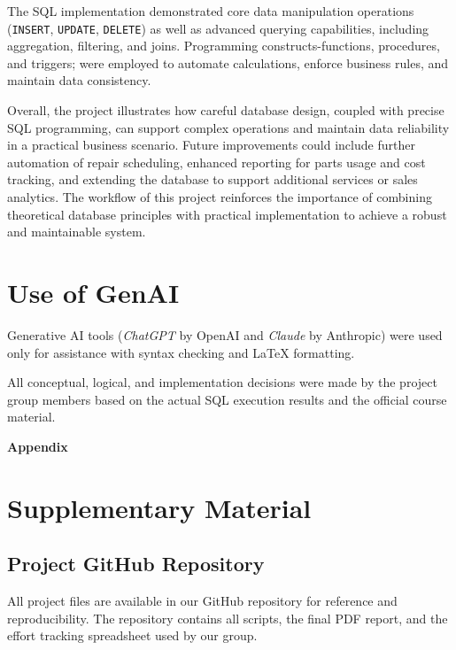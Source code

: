 \documentclass[dtu]{dtuarticle}
\begin{document}
The SQL implementation demonstrated core data manipulation operations (\texttt{INSERT}, \texttt{UPDATE}, \texttt{DELETE}) as well as advanced querying capabilities, including aggregation, filtering, and joins. Programming constructs-functions, procedures, and triggers; were employed to automate calculations, enforce business rules, and maintain data consistency.

Overall, the project illustrates how careful database design, coupled with precise SQL programming, can support complex operations and maintain data reliability in a practical business scenario. Future improvements could include further automation of repair scheduling, enhanced reporting for parts usage and cost tracking, and extending the database to support additional services or sales analytics. The workflow of this project reinforces the importance of combining theoretical database principles with practical implementation to achieve a robust and maintainable system.

\section*{Use of GenAI}
Generative AI tools (\textit{ChatGPT} by OpenAI and \textit{Claude} by Anthropic) were used only for assistance with syntax checking and \LaTeX{} formatting.

All conceptual, logical, and implementation decisions were made by the project group members based on the actual SQL execution results and the official course material.




\vspace*{1cm}
\appendix
\LARGE\bfseries Appendix
\normalsize\normalfont

\section{Supplementary Material}

\subsection{Project GitHub Repository}

All project files are available in our GitHub repository for reference and reproducibility.  
The repository contains all scripts, the final PDF report, and the effort tracking spreadsheet used by our group.
\end{document}
